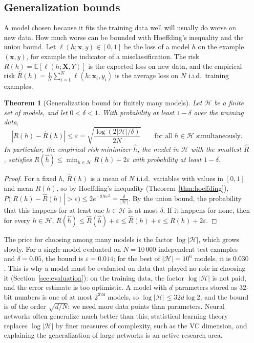 \documentclass[11pt]{article}
\newcommand{\E}{\mathbb{E}}
\theoremstyle{definition}
\theoremstyle{plain}
\newtheorem{theorem}[definition]{Theorem}
\theoremstyle{remark}
\begin{document}
\subsection{Generalization bounds}\label{sec:generalization}

A model chosen because it fits the training data well will usually do worse on new data. How much worse can be bounded with Hoeffding's inequality and the union bound. Let $\ell(h; \mathbf{x}, y) \in [0, 1]$ be the loss of a model $h$ on the example $(\mathbf{x}, y)$, for example the indicator of a misclassification. The risk $R(h) = \E[\ell(h; \mathbf{X}, Y)]$ is the expected loss on new data, and the empirical risk $\hat R(h) = \frac{1}{N}\sum_{i=1}^N \ell(h; \mathbf{x}_i, y_i)$ is the average loss on $N$ i.i.d.\ training examples.

\begin{theorem}[Generalization bound for finitely many models]\label{thm:generalization}
    Let $\mathcal{H}$ be a finite set of models, and let $0 < \delta < 1$. With probability at least $1 - \delta$ over the training data,
    \[|R(h) - \hat R(h)| \leq \varepsilon = \sqrt{\frac{\log(2|\mathcal{H}|/\delta)}{2N}} \qquad \text{for all } h \in \mathcal{H} \text{ simultaneously}.\]
    In particular, the empirical risk minimizer $\hat h$, the model in $\mathcal{H}$ with the smallest $\hat R$, satisfies $R(\hat h) \leq \min_{h \in \mathcal{H}} R(h) + 2\varepsilon$ with probability at least $1 - \delta$.
\end{theorem}

\begin{proof}
    For a fixed $h$, $\hat R(h)$ is a mean of $N$ i.i.d.\ variables with values in $[0, 1]$ and mean $R(h)$, so by Hoeffding's inequality (Theorem~\ref{thm:hoeffding}), $P\big(|R(h) - \hat R(h)| > \varepsilon\big) \leq 2e^{-2N\varepsilon^2} = \frac{\delta}{|\mathcal{H}|}$. By the union bound, the probability that this happens for at least one $h \in \mathcal{H}$ is at most $\delta$. If it happens for none, then for every $h \in \mathcal{H}$, $R(\hat h) \leq \hat R(\hat h) + \varepsilon \leq \hat R(h) + \varepsilon \leq R(h) + 2\varepsilon$.
\end{proof}

The price for choosing among many models is the factor $\log|\mathcal{H}|$, which grows slowly. For a single model evaluated on $N = 10\,000$ independent test examples and $\delta = 0.05$, the bound is $\varepsilon = 0.014$; for the best of $|\mathcal{H}| = 10^6$ models, it is $0.030$. This is why a model must be evaluated on data that played no role in choosing it (Section~\ref{sec:evaluation}): on the training data, the factor $\log|\mathcal{H}|$ is not paid, and the error estimate is too optimistic. A model with $d$ parameters stored as $32$-bit numbers is one of at most $2^{32d}$ models, so $\log|\mathcal{H}| \leq 32d\log 2$, and the bound is of the order $\sqrt{d/N}$: we need more data points than parameters. Neural networks often generalize much better than this; statistical learning theory replaces $\log|\mathcal{H}|$ by finer measures of complexity, such as the VC dimension, and explaining the generalization of large networks is an active research area.
\end{document}
